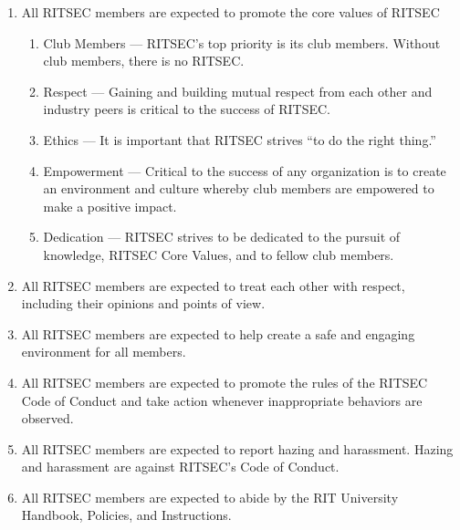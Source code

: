 


\begin{enumerate}
      \item All RITSEC members are expected to promote the core values of RITSEC
            \begin{enumerate}
                  \item Club Members --- RITSEC's top priority is its club members. Without club
                        members, there is no RITSEC.\@
                  \item Respect --- Gaining and building mutual respect from each other and industry
                        peers is critical to the success of RITSEC.\@
                  \item Ethics --- It is important that RITSEC strives ``to do the right thing.''
                  \item Empowerment --- Critical to the success of any organization is to create an
                        environment and culture whereby club members are empowered to make a positive
                        impact.
                  \item Dedication --- RITSEC strives to be dedicated to the pursuit of knowledge,
                        RITSEC Core Values, and to fellow club members.
            \end{enumerate}
      \item All RITSEC members are expected to treat each other with respect, including
            their opinions and points of view.
      \item All RITSEC members are expected to help create a safe and engaging environment
            for all members.
      \item All RITSEC members are expected to promote the rules of the RITSEC Code of
            Conduct and take action whenever inappropriate behaviors are observed.
      \item All RITSEC members are expected to report hazing and harassment. Hazing and
            harassment are against RITSEC's Code of Conduct.
      \item All RITSEC members are expected to abide by the RIT University Handbook, Policies, and Instructions.
\end{enumerate}

